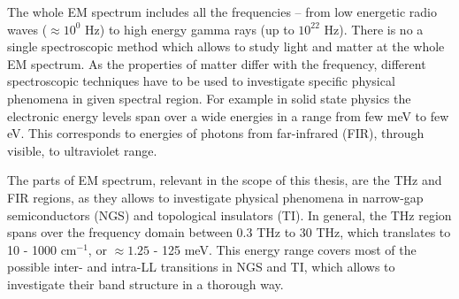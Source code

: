 \documentclass[titlepage,a4paper]{book}
\begin{document}

The whole EM spectrum includes all the frequencies -- from low energetic radio waves ($\approx 10^0$ Hz) to high energy gamma rays (up to $10^{22}$ Hz). There is no a single spectroscopic method which allows to study light and matter at the whole EM spectrum. As the properties of matter differ with the frequency, different spectroscopic techniques have to be used to investigate specific physical phenomena in given spectral region. For example in solid state physics the electronic energy levels span over a wide energies in a range from few meV   to few eV. This corresponds to energies of photons from far-infrared (FIR), through visible, to ultraviolet range.

The parts of EM spectrum, relevant in the scope of this thesis, are the THz and FIR regions, as they allows to investigate physical phenomena in narrow-gap semiconductors (NGS) and topological insulators (TI). In general, the THz region spans over the frequency domain between 0.3 THz to 30 THz, which translates to 10 - 1000 cm$^{-1}$, or $\approx 1.25$ - 125 meV. This energy range covers most of the possible inter- and intra-LL transitions in NGS and TI, which allows to investigate their band structure in a thorough way.  
\end{document}
